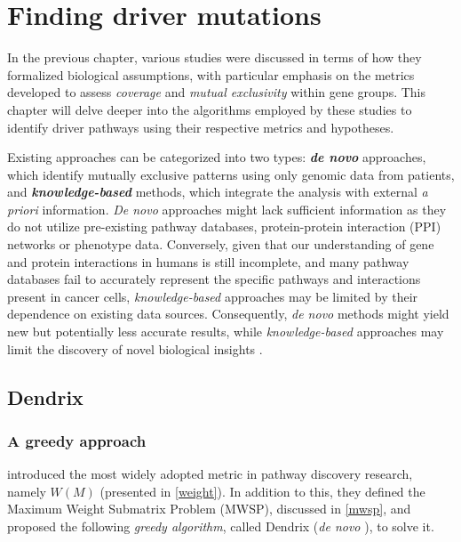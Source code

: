 \chapter{Finding driver mutations} \label{chap:finding_driver_mutations}


In the previous chapter, various studies were discussed in terms of how they formalized biological assumptions, with particular emphasis on the metrics developed to assess \textit{coverage} and \textit{mutual exclusivity} within gene groups. This chapter will delve deeper into the algorithms employed by these studies to identify driver pathways using their respective metrics and hypotheses.

Existing approaches can be categorized into two types: \textbf{\textit{de novo}} approaches, which identify mutually exclusive patterns using only genomic data from patients, and \textbf{\textit{knowledge-based}} methods, which integrate the analysis with external \textit{a priori} information. \textit{De novo} approaches might lack sufficient information as they do not utilize pre-existing pathway databases, protein-protein interaction (PPI) networks or phenotype data. Conversely, given that our understanding of gene and protein interactions in humans is still incomplete, and many pathway databases fail to accurately represent the specific pathways and interactions present in cancer cells, \textit{knowledge-based} approaches may be limited by their dependence on existing data sources. Consequently, \textit{de novo} methods might yield new but potentially less accurate results, while \textit{knowledge-based} approaches may limit the discovery of novel biological insights \cite{survey, multi-dendrix}.

\section{Dendrix}

\subsection{A greedy approach} \label{dendrix_first_sub}

\textcite{dendrix} introduced the most widely adopted metric in pathway discovery research, namely $W(M)$ (presented in \cref{weight}). In addition to this, they defined the Maximum Weight Submatrix Problem (MWSP), discussed in \cref{mwsp}, and proposed the following \textit{greedy algorithm}, called Dendrix (\textit{de novo} \cite{survey}), to solve it.

